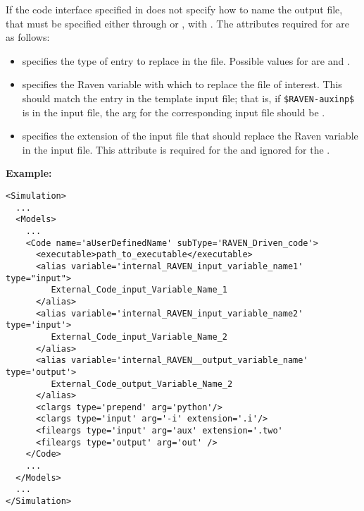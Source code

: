 \begin{itemize}
  If the code interface specified in  
  does not specify how to name the output file, that must be specified either through
   or , with  .
  The attributes required for  are as follows:
  \begin{itemize}
    \item {}  specifies the type
    of entry to replace in the file.  Possible values for 
     are  and .
    \item {}  specifies the Raven
    variable with which to replace the file of interest.  This should match
    the entry in the template input file; that is, if \texttt{\$RAVEN-auxinp\$}
    is in the input file, the arg for the corresponding input file should be
    .
    \item {}  specifies the
    extension of the input file that should replace the Raven variable in
    the input file.  This attribute is required for the  
    and ignored for the  .
  \end{itemize}
\end{itemize}
\textbf{Example:}
\begin{lstlisting}[style=XML,morekeywords={subType,name,variable}]
<Simulation>
  ...
  <Models>
    ...
    <Code name='aUserDefinedName' subType='RAVEN_Driven_code'>
      <executable>path_to_executable</executable>
      <alias variable='internal_RAVEN_input_variable_name1' type="input">
         External_Code_input_Variable_Name_1
      </alias>
      <alias variable='internal_RAVEN_input_variable_name2' type='input'>
         External_Code_input_Variable_Name_2
      </alias>
      <alias variable='internal_RAVEN__output_variable_name' type='output'>
         External_Code_output_Variable_Name_2
      </alias>
      <clargs type='prepend' arg='python'/>
      <clargs type='input' arg='-i' extension='.i'/>
      <fileargs type='input' arg='aux' extension='.two'
      <fileargs type='output' arg='out' />
    </Code>
    ...
  </Models>
  ...
</Simulation>
\end{lstlisting}

